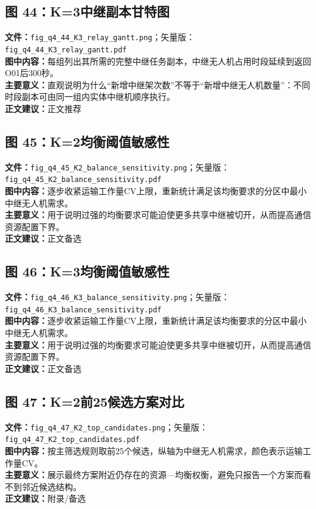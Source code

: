\subsection*{图 44：K=3中继副本甘特图}
\textbf{文件：}\texttt{fig\_q4\_44\_K3\_relay\_gantt.png}；矢量版：\texttt{fig\_q4\_44\_K3\_relay\_gantt.pdf}\\
\textbf{图中内容：}每组列出其所需的完整中继任务副本，中继无人机占用时段延续到返回O01后300秒。\\
\textbf{主要意义：}直观说明为什么“新增中继架次数”不等于“新增中继无人机数量”：不同时段副本可由同一组内实体中继机顺序执行。\\
\textbf{正文建议：}正文推荐

\subsection*{图 45：K=2均衡阈值敏感性}
\textbf{文件：}\texttt{fig\_q4\_45\_K2\_balance\_sensitivity.png}；矢量版：\texttt{fig\_q4\_45\_K2\_balance\_sensitivity.pdf}\\
\textbf{图中内容：}逐步收紧运输工作量CV上限，重新统计满足该均衡要求的分区中最小中继无人机需求。\\
\textbf{主要意义：}用于说明过强的均衡要求可能迫使更多共享中继被切开，从而提高通信资源配置下界。\\
\textbf{正文建议：}正文备选

\subsection*{图 46：K=3均衡阈值敏感性}
\textbf{文件：}\texttt{fig\_q4\_46\_K3\_balance\_sensitivity.png}；矢量版：\texttt{fig\_q4\_46\_K3\_balance\_sensitivity.pdf}\\
\textbf{图中内容：}逐步收紧运输工作量CV上限，重新统计满足该均衡要求的分区中最小中继无人机需求。\\
\textbf{主要意义：}用于说明过强的均衡要求可能迫使更多共享中继被切开，从而提高通信资源配置下界。\\
\textbf{正文建议：}正文备选

\subsection*{图 47：K=2前25候选方案对比}
\textbf{文件：}\texttt{fig\_q4\_47\_K2\_top\_candidates.png}；矢量版：\texttt{fig\_q4\_47\_K2\_top\_candidates.pdf}\\
\textbf{图中内容：}按主筛选规则取前25个候选，纵轴为中继无人机需求，颜色表示运输工作量CV。\\
\textbf{主要意义：}展示最终方案附近仍存在的资源—均衡权衡，避免只报告一个方案而看不到邻近候选结构。\\
\textbf{正文建议：}附录/备选

